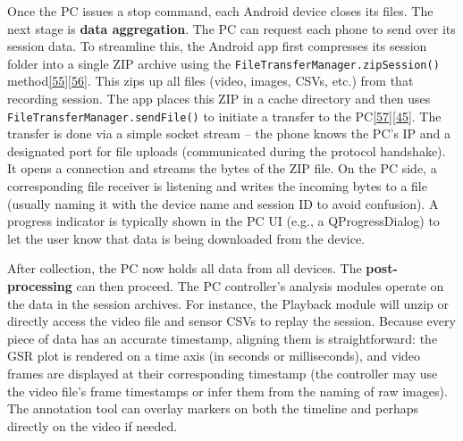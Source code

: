 \documentclass[12pt,a4paper]{article}
\begin{document}
Once the PC issues a stop command, each Android device closes its files. The next stage is \textbf{data aggregation}. The PC can request each phone to send over its session data. To streamline this, the Android app first compresses its session folder into a single ZIP archive using the \passthrough{\lstinline!FileTransferManager.zipSession()!} method\href{https://github.com/buccancs/GSR-Dual-Video-System/blob/05ae360cb7b4ae7c7861f72deb235ad64a74b38e/android/app/src/main/java/com/yourcompany/gsrcapture/manager/FileTransferManager.kt\#L19-L28}{{[}55{]}}\href{https://github.com/buccancs/GSR-Dual-Video-System/blob/05ae360cb7b4ae7c7861f72deb235ad64a74b38e/android/app/src/main/java/com/yourcompany/gsrcapture/manager/FileTransferManager.kt\#L29-L37}{{[}56{]}}. This zips up all files (video, images, CSVs, etc.) from that recording session. The app places this ZIP in a cache directory and then uses \passthrough{\lstinline!FileTransferManager.sendFile()!} to initiate a transfer to the PC\href{https://github.com/buccancs/GSR-Dual-Video-System/blob/05ae360cb7b4ae7c7861f72deb235ad64a74b38e/android/app/src/main/java/com/yourcompany/gsrcapture/manager/FileTransferManager.kt\#L45-L54}{{[}57{]}}\href{https://github.com/buccancs/GSR-Dual-Video-System/blob/05ae360cb7b4ae7c7861f72deb235ad64a74b38e/android/app/src/main/java/com/yourcompany/gsrcapture/manager/FileTransferManager.kt\#L50-L58}{{[}45{]}}. The transfer is done via a simple socket stream -- the phone knows the PC's IP and a designated port for file uploads (communicated during the protocol handshake). It opens a connection and streams the bytes of the ZIP file. On the PC side, a corresponding file receiver is listening and writes the incoming bytes to a file (usually naming it with the device name and session ID to avoid confusion). A progress indicator is typically shown in the PC UI (e.g., a QProgressDialog) to let the user know that data is being downloaded from the device.

After collection, the PC now holds all data from all devices. The \textbf{post-processing} can then proceed. The PC controller's analysis modules operate on the data in the session archives. For instance, the Playback module will unzip or directly access the video file and sensor CSVs to replay the session. Because every piece of data has an accurate timestamp, aligning them is straightforward: the GSR plot is rendered on a time axis (in seconds or milliseconds), and video frames are displayed at their corresponding timestamp (the controller may use the video file's frame timestamps or infer them from the naming of raw images). The annotation tool can overlay markers on both the timeline and perhaps directly on the video if needed.
\end{document}
